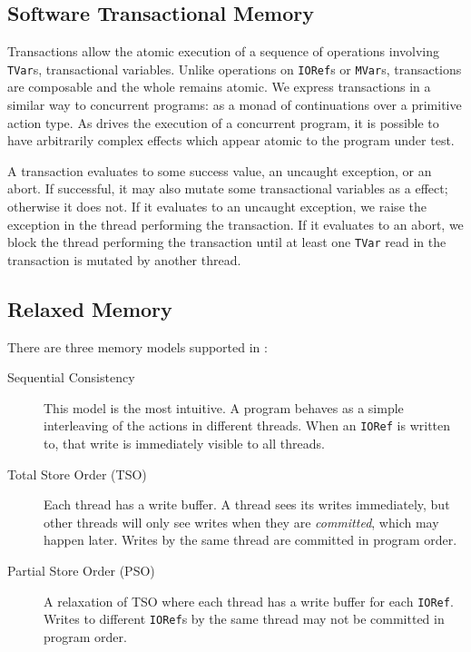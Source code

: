 \subsection{Software Transactional Memory}

Transactions allow the atomic execution of a sequence of operations
involving \verb|TVar|s, transactional variables.  Unlike operations on
\verb|IORef|s or \verb|MVar|s, transactions are composable and the
whole remains atomic.  We express transactions in a similar way to
concurrent programs: as a monad of continuations over a primitive
action type.  As \dejafu{} drives the execution of a concurrent
program, it is possible to have arbitrarily complex effects which
appear atomic to the program under test.

A transaction evaluates to some success value, an uncaught exception,
or an abort.  If successful, it may also mutate some transactional
variables as a effect; otherwise it does not.  If it evaluates to an
uncaught exception, we raise the exception in the thread performing
the transaction.  If it evaluates to an abort, we block the thread
performing the transaction until at least one \verb|TVar| read in the
transaction is mutated by another thread.

\subsection{Relaxed Memory}

There are three memory models supported in \dejafu{}:

\begin{description}
\item[Sequential Consistency] This model is the most intuitive.  A program
  behaves as a simple interleaving of the actions in different threads.  When an
  \texttt{IORef} is written to, that write is immediately visible to all
  threads.

\item[Total Store Order (TSO)] Each thread has a write buffer.  A thread sees
  its writes immediately, but other threads will only see writes when they are
  \emph{committed}, which may happen later.  Writes by the same thread are
  committed in program order.

\item[Partial Store Order (PSO)] A relaxation of TSO where each thread
  has a write buffer for each \verb|IORef|.  Writes to different
  \verb|IORef|s by the same thread may not be committed in program
  order.
\end{description}

